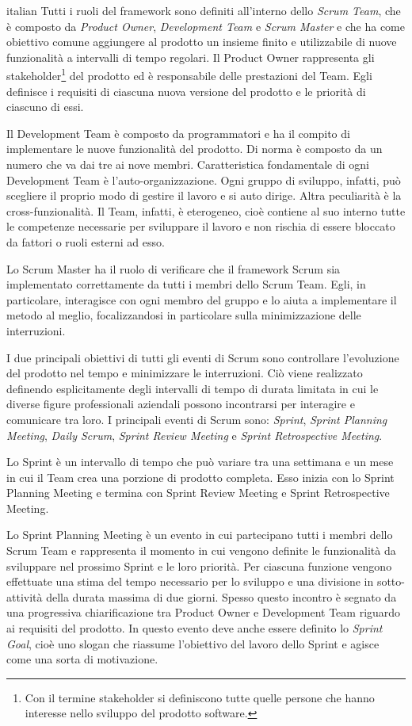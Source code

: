 \begin{otherlanguage*}{italian}
			Tutti i ruoli del framework sono definiti all'interno dello \emph{Scrum Team}, che è composto da \emph{Product Owner}, \emph{Development Team} e \emph{Scrum Master} e che ha come obiettivo comune aggiungere al prodotto un insieme finito e utilizzabile di nuove funzionalità a intervalli di tempo regolari.
			Il Product Owner rappresenta gli stakeholder\footnote{Con il termine stakeholder si definiscono tutte quelle persone che hanno interesse nello sviluppo del prodotto software.} del prodotto ed è responsabile delle prestazioni del Team.
			Egli definisce i requisiti di ciascuna nuova versione del prodotto e le priorità di ciascuno di essi.
			
			Il Development Team è composto da programmatori e ha il compito di implementare le nuove funzionalità del prodotto.
			Di norma è composto da un numero che va dai tre ai nove membri.
			Caratteristica fondamentale di ogni Development Team è l'auto-organizzazione. 
			Ogni gruppo di sviluppo, infatti, può scegliere il proprio modo di gestire il lavoro e si auto dirige.
			Altra peculiarità è la cross-funzionalità.
			Il Team, infatti, è eterogeneo, cioè contiene al suo interno tutte le competenze necessarie per sviluppare il lavoro e non rischia di essere bloccato da fattori o ruoli esterni ad esso. 
			
			Lo Scrum Master ha il ruolo di verificare che il framework Scrum sia implementato correttamente da tutti i membri dello Scrum Team.
			Egli, in particolare, interagisce con ogni membro del gruppo e lo aiuta a implementare il metodo al meglio, focalizzandosi in particolare sulla minimizzazione delle interruzioni.

			I due principali obiettivi di tutti gli eventi di Scrum sono controllare l'evoluzione del prodotto nel tempo e minimizzare le interruzioni. 
			Ciò viene realizzato definendo esplicitamente degli intervalli di tempo di durata limitata in cui le diverse figure professionali aziendali possono incontrarsi per interagire e comunicare tra loro.
			I principali eventi di Scrum sono: \emph{Sprint}, \emph{Sprint Planning Meeting}, \emph{Daily Scrum}, \emph{Sprint Review Meeting} e \emph{Sprint Retrospective Meeting}.

			Lo Sprint è un intervallo di tempo che può variare tra una settimana e un mese in cui il Team crea una porzione di prodotto completa. 
			Esso inizia con lo Sprint Planning Meeting e termina con Sprint Review Meeting e Sprint Retrospective Meeting.
			
			Lo Sprint Planning Meeting è un evento in cui partecipano tutti i membri dello Scrum Team e rappresenta il momento in cui vengono definite le funzionalità da sviluppare nel prossimo Sprint e le loro priorità.
			Per ciascuna funzione vengono effettuate una stima del tempo necessario per lo sviluppo e una divisione in sotto-attività della durata massima di due giorni.
			Spesso questo incontro è segnato da una progressiva chiarificazione tra Product Owner e Development Team riguardo ai requisiti del prodotto. 
			In questo evento deve anche essere definito lo \emph{Sprint Goal}, cioè uno slogan che riassume l'obiettivo del lavoro dello Sprint e agisce come una sorta di motivazione.
		

\end{otherlanguage*}
